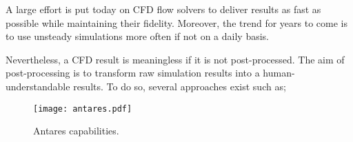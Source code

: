 
\label{app:antares}

A large effort is put today on CFD flow solvers
to deliver results as fast as possible while
maintaining their fidelity. Moreover, the trend
for years to come is to use unsteady simulations more 
often if not on a daily basis.

Nevertheless, a CFD result is meaningless
if it is not post-processed. The aim of post-processing is
to transform raw simulation results into a human-understandable
results. To do so, several approaches exist such as;



\begin{figure}[htp]
  \centering
  \texttt{[image: antares.pdf]}
  \caption{Antares capabilities.}
  \label{fig:antares}
\end{figure}